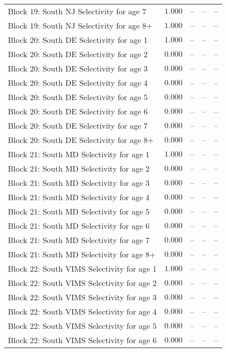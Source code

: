 \documentclass[
]{article}
\begin{document}
\begin{landscape}
\begin{longtable}[t]{lrrrr}
Block 19: South NJ Selectivity for age 7 & $1.000$ & -- & -- & --\\
Block 19: South NJ Selectivity for age 8+ & $1.000$ & -- & -- & --\\
\addlinespace
Block 20: South DE Selectivity for age 1 & $1.000$ & -- & -- & --\\
Block 20: South DE Selectivity for age 2 & $0.000$ & -- & -- & --\\
Block 20: South DE Selectivity for age 3 & $0.000$ & -- & -- & --\\
Block 20: South DE Selectivity for age 4 & $0.000$ & -- & -- & --\\
Block 20: South DE Selectivity for age 5 & $0.000$ & -- & -- & --\\
\addlinespace
Block 20: South DE Selectivity for age 6 & $0.000$ & -- & -- & --\\
Block 20: South DE Selectivity for age 7 & $0.000$ & -- & -- & --\\
Block 20: South DE Selectivity for age 8+ & $0.000$ & -- & -- & --\\
Block 21: South MD Selectivity for age 1 & $1.000$ & -- & -- & --\\
Block 21: South MD Selectivity for age 2 & $0.000$ & -- & -- & --\\
\addlinespace
Block 21: South MD Selectivity for age 3 & $0.000$ & -- & -- & --\\
Block 21: South MD Selectivity for age 4 & $0.000$ & -- & -- & --\\
Block 21: South MD Selectivity for age 5 & $0.000$ & -- & -- & --\\
Block 21: South MD Selectivity for age 6 & $0.000$ & -- & -- & --\\
Block 21: South MD Selectivity for age 7 & $0.000$ & -- & -- & --\\
\addlinespace
Block 21: South MD Selectivity for age 8+ & $0.000$ & -- & -- & --\\
Block 22: South VIMS Selectivity for age 1 & $1.000$ & -- & -- & --\\
Block 22: South VIMS Selectivity for age 2 & $0.000$ & -- & -- & --\\
Block 22: South VIMS Selectivity for age 3 & $0.000$ & -- & -- & --\\
Block 22: South VIMS Selectivity for age 4 & $0.000$ & -- & -- & --\\
\addlinespace
Block 22: South VIMS Selectivity for age 5 & $0.000$ & -- & -- & --\\
Block 22: South VIMS Selectivity for age 6 & $0.000$ & -- & -- & --\\

\end{longtable}
\end{landscape}
\end{document}
